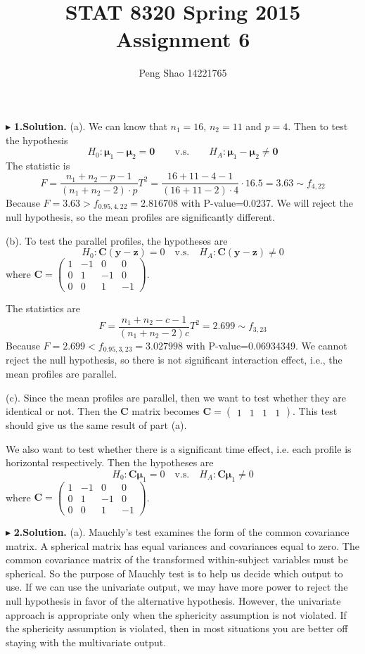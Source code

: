 \documentclass[letterpaper, 12pt]{article}
\newcommand{\lma}{\left(\begin{matrix}}
\newcommand{\rma}{\end{matrix}\right)}
\begin{document}
\title{STAT 8320 Spring 2015 Assignment 6}
\author{Peng Shao 14221765}
\maketitle
\indent




$\blacktriangleright$ \textbf{1.\quad Solution.} 
(a). We can know that $n_1=16$, $n_2=11$ and $p=4$. Then to test the hypothesis
$$
H_0:\bm{\mu}_1-\bm{\mu}_2=\bm{0}\qquad\text{v.s.}\qquad H_A:\bm{\mu}_1-\bm{\mu}_2\not=\bm{0}
$$
The statistic is
$$
F=\frac{n_1+n_2-p-1}{(n_1+n_2-2)\cdot p}T^2=\frac{16+11-4-1}{(16+11-2)\cdot 4}\cdot16.5=3.63\sim f_{4,22}
$$
Because $F=3.63>f_{0.95,4,22}=2.816708$ with P-value=0.0237. We will reject the null hypothesis, so the mean profiles are significantly different.

(b). To test the parallel profiles, the hypotheses are
$$
H_0:\bm{C}(\bm{y}-\bm{z})=0\quad\text{v.s.}\quad H_A: \bm{C}(\bm{y}-\bm{z})\not=0
$$where $\bm{C}=\lma 1 &-1 &0 &0\\ 0 &1 &-1 &0\\ 0 &0 &1 &-1\rma$. 

The statistics are
$$
F=\frac{n_1+n_2-c-1}{(n_1+n_2-2)c}T^2=2.699\sim f_{3,23}
$$
Because $F=2.699<f_{0.95,3,23}=3.027998$ with P-value=0.06934349. We cannot reject the null hypothesis, so there is not significant interaction effect, i.e., the mean profiles are parallel.

(c). Since the mean profiles are parallel, then we want to test whether they are identical or not. Then the $\bm{C}$ matrix becomes 
$
\bm{C}=\lma 1 &1 &1 &1\rma
$.
This test should give us the same result of part (a).

We also want to test whether there is a significant time effect, i.e. each profile is horizontal respectively. Then the hypotheses are
$$
H_0:\bm{C\mu}_1=0\quad\text{v.s.}\quad H_A:\bm{C\mu}_1\not=0
$$
where $\bm{C}=\lma 1 &-1 &0 &0\\ 0 &1 &-1 &0\\ 0 &0 &1 &-1\rma$.




$\blacktriangleright$ \textbf{2.\quad Solution.} 
(a). Mauchly's test examines the form of the common covariance matrix. A spherical matrix has equal variances and covariances equal to zero. The common covariance matrix of the transformed within-subject variables must be spherical. So the purpose of Mauchly test is to help us decide which output to use. If we can use the univariate output, we may have more power to reject the null hypothesis in favor of the alternative hypothesis. However, the univariate approach is appropriate only when the sphericity assumption is not violated. If the sphericity assumption is violated, then in most situations you are better off staying with the multivariate output.
\end{document}
